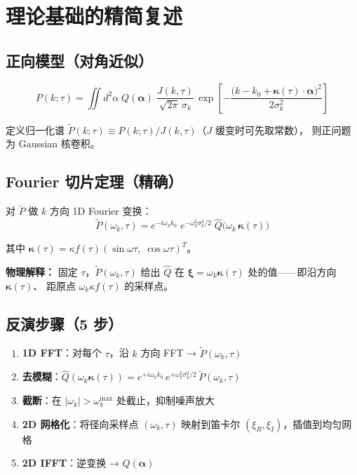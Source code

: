 \documentclass[11pt,a4paper]{ctexart}
\begin{document}
\section{理论基础的精简复述}

\subsection{正向模型（对角近似）}

\begin{equation}\label{eq:forward}
    P(k;\tau) = \iint d^2\alpha \; Q(\boldsymbol{\alpha}) \;
    \frac{J(k,\tau)}{\sqrt{2\pi}\,\sigma_k} \,
    \exp\!\left[-\frac{\bigl(k - k_0 + \boldsymbol{\kappa}(\tau)\!\cdot\!\boldsymbol{\alpha}\bigr)^2}
    {2\sigma_k^2}\right]
\end{equation}

定义归一化谱 $\tilde{P}(k;\tau) \equiv P(k;\tau) / J(k,\tau)$（$J$ 缓变时可先取常数），
则正问题为 Gaussian 核卷积。

\subsection{Fourier 切片定理（精确）}

对 $\tilde{P}$ 做 $k$ 方向 1D Fourier 变换：
\begin{equation}\label{eq:slice}
    \boxed{\tilde{P}(\omega_k,\tau)
    = e^{-i\omega_k k_0} \; e^{-\omega_k^2\sigma_k^2/2} \;
    \hat{Q}\bigl(\omega_k\,\boldsymbol{\kappa}(\tau)\bigr)}
\end{equation}

其中 $\boldsymbol{\kappa}(\tau) = \kappa f(\tau)(\sin\omega\tau,\;\cos\omega\tau)^T$。

\textbf{物理解释：} 固定 $\tau$，$\tilde{P}(\omega_k,\tau)$ 给出 $\hat{Q}$ 在
$\boldsymbol{\xi} = \omega_k\boldsymbol{\kappa}(\tau)$ 处的值——即沿方向 $\boldsymbol{\kappa}(\tau)$、
距原点 $\omega_k\kappa f(\tau)$ 的采样点。

\subsection{反演步骤（5 步）}

\begin{enumerate}
    \item \textbf{1D FFT}：对每个 $\tau$，沿 $k$ 方向 FFT → $\tilde{P}(\omega_k,\tau)$
    \item \textbf{去模糊}：$\hat{Q}(\omega_k\boldsymbol{\kappa}(\tau))
        = e^{+i\omega_k k_0}\, e^{+\omega_k^2\sigma_k^2/2}\,
        \tilde{P}(\omega_k,\tau)$
    \item \textbf{截断}：在 $|\omega_k| > \omega_k^{\max}$ 处截止，抑制噪声放大
    \item \textbf{2D 网格化}：将径向采样点 $(\omega_k,\tau)$ 映射到笛卡尔
        $(\xi_R,\xi_I)$，插值到均匀网格
    \item \textbf{2D IFFT}：逆变换 → $Q(\boldsymbol{\alpha})$
\end{enumerate}
\end{document}
